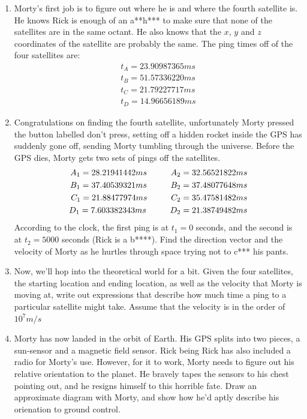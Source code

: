 \documentclass[a4paper, 12pt]{exam}
\newcommand{\cuspac}{\hspace*{1cm}}
\begin{document}
	\begin{enumerate}[label = (\alph*)]
		\item Morty's first job is to figure out where he is and where the fourth satellite is. He knows Rick is enough of an a**h*** to make sure that none of the satellites are in the same octant. He also knows that the $x$, $y$ and $z$ coordinates of the satellite are probably the same. The ping times off of the four satellites are:
		\begin{align*}
			t_A = 23.90987365 ms \\
			t_B = 51.57336220 ms \\
			t_C = 21.79227717 ms \\
			t_D = 14.96656189 ms
		\end{align*}
		\item Congratulations on finding the fourth satellite, unfortunately Morty pressed the button labelled don't press, setting off a hidden rocket inside the GPS has suddenly gone off, sending Morty tumbling through the universe. Before the GPS dies, Morty gets two sets of pings off the satellites.
		\begin{align*}
			A_1 = 28.21941442 ms \cuspac A_2 = 32.56521822 ms\\
			B_1 = 37.40539321 ms \cuspac B_2 = 37.48077648 ms\\
			C_1 = 21.88477974 ms \cuspac C_2 = 35.47581482 ms\\
			D_1 = 7.603382343 ms \cuspac D_2 = 21.38749482 ms
		\end{align*}
		According to the clock, the first ping is at $t_1 = 0$ seconds, and the second is at $t_2 = 5000$ seconds (Rick is a b****). Find the direction vector and the velocity of Morty as he hurtles through space trying not to c*** his pants.
		\item Now, we'll hop into the theoretical world for a bit. Given the four satellites, the starting location and ending location, as well as the velocity that Morty is moving at, write out expressions that describe how much time a ping to a particular satellite might take. Assume that the velocity is in the order of $10^7 m/s$
		\item Morty has now landed in the orbit of Earth. His GPS splits into two pieces, a sun-sensor and a magnetic field sensor. Rick being Rick has also included a radio for Morty's use. However, for it to work, Morty needs to figure out his relative orientation to the planet. He bravely tapes the sensors to his chest pointing out, and he resigns himself to this horrible fate. Draw an approximate diagram with Morty, and show how he'd aptly describe his orienation to ground control.
	\end{enumerate}
\end{document}
